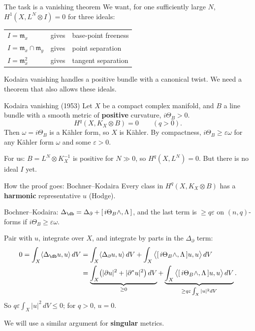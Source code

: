 \begin{frame}{The task is a vanishing theorem}
We want, for one sufficiently large \(N\),
\(H^1(X,L^N\otimes I)=0\) for three ideals:
\begin{center}
\renewcommand{\arraystretch}{1.6}
\begin{tabular}{lll}
\(I=\mathfrak m_x\) & gives & base-point freeness\\
\(I=\mathfrak m_x\cap\mathfrak m_y\) & gives & point separation\\
\(I=\mathfrak m_x^2\) & gives & tangent separation
\end{tabular}
\end{center}
Kodaira vanishing handles a positive bundle with a canonical twist.
We need a theorem that also allows these ideals.
\end{frame}

\begin{frame}{Kodaira vanishing (1953)}
Let \(X\) be a compact complex manifold, and \(B\) a line bundle with a smooth metric of \textbf{positive} curvature, \(i\Theta_B>0\).
\[
\boxed{H^q(X,K_X\otimes B)=0\qquad(q>0).}
\]
Then \(\omega=i\Theta_B\) is a Kähler form, so \(X\) is Kähler.
By compactness, \(i\Theta_B\ge\varepsilon\omega\) for any Kähler form \(\omega\) and some \(\varepsilon>0\).
\par\medskip
For us: \(B=L^N\otimes K_X^{-1}\) is positive for \(N\gg0\), so \(H^q(X,L^N)=0\).
But there is no ideal \(I\) yet.
\end{frame}

\begin{frame}{How the proof goes: Bochner--Kodaira}
Every class in \(H^q(X,K_X\otimes B)\) has a \textbf{harmonic} representative \(u\) (Hodge).
\par\medskip
Bochner--Kodaira: \(\Delta_{\db}=\Delta_{\partial}+[\,i\Theta_B\wedge,\Lambda\,]\),
and the last term is \(\ge q\varepsilon\) on \((n,q)\)-forms if \(i\Theta_B\ge\varepsilon\omega\).
\par\medskip
Pair with \(u\), integrate over \(X\), and integrate by parts in the \(\Delta_\partial\) term:
\[
\begin{aligned}
0=\int_X\langle\Delta_{\db}u,u\rangle\,dV
&=\int_X\langle\Delta_{\partial}u,u\rangle\,dV+\int_X\big\langle[\,i\Theta_B\wedge,\Lambda\,]u,u\big\rangle\,dV\\
&=\underbrace{\int_X\bigl(|\partial u|^2+|\partial^*u|^2\bigr)\,dV}_{\ge0}
+\underbrace{\int_X\big\langle[\,i\Theta_B\wedge,\Lambda\,]u,u\big\rangle\,dV}_{\ge q\varepsilon\int_X|u|^2dV}.
\end{aligned}
\]
So \(q\varepsilon\int_X|u|^2\,dV\le0\); for \(q>0\), \(u=0\).
\par\medskip
We will use a similar argument for \textbf{singular} metrics.
\end{frame}

